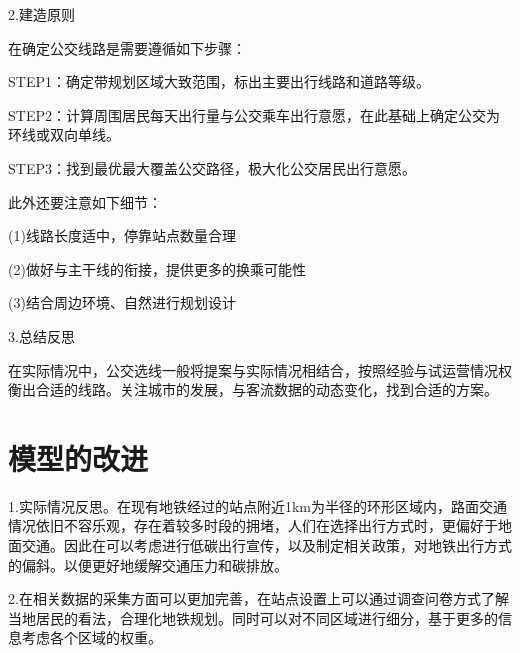 \documentclass[12pt,a4paper]{mcmthesis}
\begin{document}
    2.建造原则

    在确定公交线路是需要遵循如下步骤：

    STEP1：确定带规划区域大致范围，标出主要出行线路和道路等级。

    STEP2：计算周围居民每天出行量与公交乘车出行意愿，在此基础上确定公交为环线或双向单线。

    STEP3：找到最优最大覆盖公交路径，极大化公交居民出行意愿。


    此外还要注意如下细节：

    (1)线路长度适中，停靠站点数量合理

    (2)做好与主干线的衔接，提供更多的换乘可能性

    (3)结合周边环境、自然进行规划设计

    3.总结反思

    在实际情况中，公交选线一般将提案与实际情况相结合，按照经验与试运营情况权衡出合适的线路。关注城市的发展，与客流数据的动态变化，找到合适的方案。


    \section{模型的改进}

    1.实际情况反思。在现有地铁经过的站点附近1km为半径的环形区域内，路面交通情况依旧不容乐观，存在着较多时段的拥堵，人们在选择出行方式时，更偏好于地面交通。因此在可以考虑进行低碳出行宣传，以及制定相关政策，对地铁出行方式的偏斜。以便更好地缓解交通压力和碳排放。

    2.在相关数据的采集方面可以更加完善，在站点设置上可以通过调查问卷方式了解当地居民的看法，合理化地铁规划。同时可以对不同区域进行细分，基于更多的信息考虑各个区域的权重。

    \newpage
    
    
\end{document}
